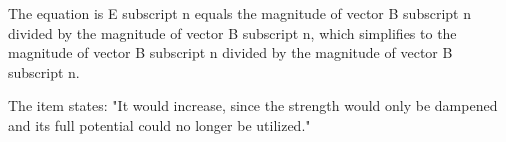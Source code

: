 The equation is E subscript n equals the magnitude of vector B subscript n divided by the magnitude of vector B subscript n, which simplifies to the magnitude of vector B subscript n divided by the magnitude of vector B subscript n.

The item states: "It would increase, since the strength would only be dampened and its full potential could no longer be utilized."